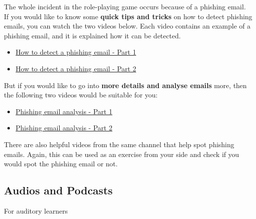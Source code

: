 The whole incident in the role-playing game occurs because of a phishing email. If you would like to know some \textbf{quick tips and tricks} on how to detect phishing emails, you can watch the two videos below. Each video contains an example of a phishing email, and it is explained how it can be detected.

\begin{itemize}
    \item \href{https://www.youtube.com/watch?v=j81Wo-khiZA}{How to detect a phishing email - Part 1}
    \item \href{https://www.youtube.com/watch?v=O0Euup8i4kY}{How to detect a phishing email - Part 2}
\end{itemize}

But if you would like to go into \textbf{more details and analyse emails} more, then the following two videos would be suitable for you: 
\begin{itemize}
   \item \href{https://www.youtube.com/watch?v=H4bLUpdFDYo}{Phishing email analysis - Part 1}
   \item \href{https://www.youtube.com/watch?v=-yFkLAveM1Q}{Phishing email analysis - Part 2}
\end{itemize}
There are also helpful videos from the same channel that help spot phishing emails. Again, this can be used as an exercise from your side and check if you would spot the phishing email or not.

\subsection{Audios and Podcasts}
For auditory learners 